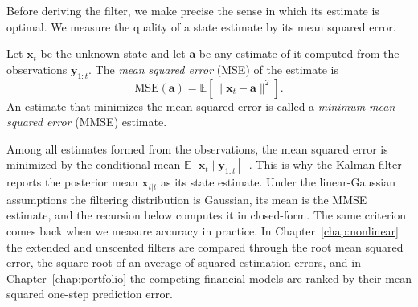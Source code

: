 Before deriving the filter, we make precise the sense in which its estimate is optimal. We measure the quality of a state estimate by its mean squared error.

\begin{definition}\label{def:mmse}
Let $\mathbf{x}_t$ be the unknown state and let $\mathbf{a}$ be any estimate of it computed from the observations $\mathbf{y}_{1:t}$. The \emph{mean squared error} (MSE) of the estimate is
\[
  \mathrm{MSE}(\mathbf{a}) = \mathbb{E}\!\left[\lVert \mathbf{x}_t - \mathbf{a} \rVert^2\right].
\]
An estimate that minimizes the mean squared error is called a \emph{minimum mean squared error} (MMSE) estimate.
\end{definition}

Among all estimates formed from the observations, the mean squared error is minimized by the conditional mean $\mathbb{E}[\mathbf{x}_t \mid \mathbf{y}_{1:t}]$~\cite[Ch.~2.4]{sarkka:bayesian_filtering}. This is why the Kalman filter reports the posterior mean $\mathbf{x}_{t|t}$ as its state estimate. Under the linear-Gaussian assumptions the filtering distribution is Gaussian, its mean is the MMSE estimate, and the recursion below computes it in closed-form. The same criterion comes back when we measure accuracy in practice. In Chapter~\ref{chap:nonlinear} the extended and unscented filters are compared through the root mean squared error, the square root of an average of squared estimation errors, and in Chapter~\ref{chap:portfolio} the competing financial models are ranked by their mean squared one-step prediction error.


    
